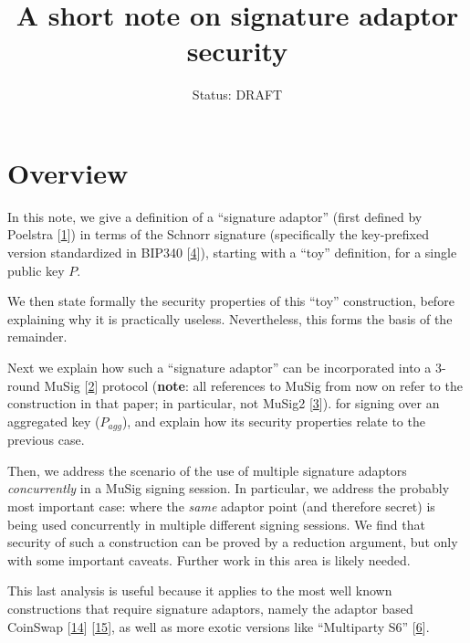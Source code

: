 \documentclass[10pt,a4paper]{article}
\author{Status: DRAFT}
\begin{document}
\title{A short note on signature adaptor security}
\maketitle

\section{Overview}

In this note, we give a definition of a ``signature adaptor'' (first defined by Poelstra {[}\protect\hyperlink{anchor-1}{1}{]}) in terms of the Schnorr signature (specifically the key-prefixed version standardized in BIP340 {[}\protect\hyperlink{anchor-4}{4}{]}), starting with a ``toy'' definition, for a single public key $P$.

\vspace{5 pt}

We then state formally the security properties of this ``toy'' construction, before explaining why it is practically useless. Nevertheless, this forms the basis of the remainder.

\vspace{5 pt}

Next we explain how such a ``signature adaptor'' can be incorporated into a 3-round MuSig {[}\protect\hyperlink{anchor-2}{2}{]} protocol (\textbf{note}: all references to MuSig from now on refer to the construction in that paper; in particular, not MuSig2 {[}\protect\hyperlink{anchor-3}{3}{]}). for signing over an aggregated key ($P_{agg}$), and explain how its security properties relate to the previous case.

\vspace{5 pt}

Then, we address the scenario of the use of multiple signature adaptors  \emph{concurrently} in a MuSig signing session. In particular, we address the probably most important case: where the \emph{same} adaptor point (and therefore secret) is being used concurrently in multiple different signing sessions. We find that security of such a construction can be proved by a reduction argument, but only with some important caveats. Further work in this area is likely needed.

\vspace{5 pt}

This last analysis is useful because it applies to the most well known constructions that require signature adaptors, namely the adaptor based CoinSwap {[}\protect\hyperlink{anchor-14}{14}{]} {[}\protect\hyperlink{anchor-15}{15}{]}, as well as more exotic versions like ``Multiparty S6'' {[}\protect\hyperlink{anchor-6}{6}{]}.
\end{document}
